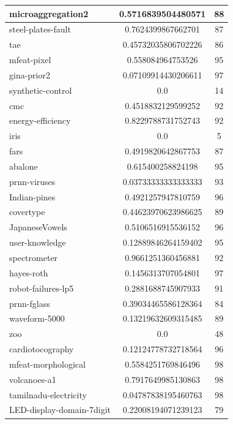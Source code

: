 \documentclass[times,specification,annotation]{itmo-student-thesis}
\begin{document}
\begin{center}
\begin{longtable}{ |m{5cm}|c|c| }
			\hline
			microaggregation2 & 0.5716839504480571 & 88 \\
			\hline
			steel-plates-fault & 0.7624399867662701 & 87 \\
			\hline
			tae & 0.45732035806702226 & 86 \\
			\hline
			mfeat-pixel & 0.558084964753526 & 95 \\
			\hline
			gina-prior2 & 0.07109914430206611 & 97 \\
			\hline
			synthetic-control & 0.0 & 14 \\
			\hline
			cmc & 0.4518832129599252 & 92 \\
			\hline
			energy-efficiency & 0.8229788731752743 & 92 \\
			\hline
			iris & 0.0 & 5 \\
			\hline
			fars & 0.4919820642867753 & 87 \\
			\hline
			abalone & 0.615400258824198 & 95 \\
			\hline
			prnn-viruses & 0.03733333333333333 & 93 \\
			\hline
			Indian-pines & 0.4921257947810759 & 96 \\
			\hline
			covertype & 0.44623970623986625 & 89 \\
			\hline
			JapaneseVowels & 0.5106516915536152 & 96 \\
			\hline
			user-knowledge & 0.12889846264159402 & 95 \\
			\hline
			spectrometer & 0.9661251360456881 & 92 \\
			\hline
			hayes-roth & 0.1456313707054801 & 97 \\
			\hline
			robot-failures-lp5 & 0.2881688745907933 & 91 \\
			\hline
			prnn-fglass & 0.39034465586128364 & 84 \\
			\hline
			waveform-5000 & 0.13219632609315485 & 89 \\
			\hline
			zoo & 0.0 & 48 \\
			\hline
			cardiotocography & 0.12124778732718564 & 96 \\
			\hline
			mfeat-morphological & 0.5584251769846496 & 98 \\
			\hline
			volcanoes-a1 & 0.7917649985130863 & 98 \\
			\hline
			tamilnadu-electricity & 0.04787838195460763 & 98 \\
			\hline
			LED-display-domain-7digit & 0.22008194071239123 & 79 \\
			\hline
			
		\end{longtable}
	\end{center}
\end{document}
